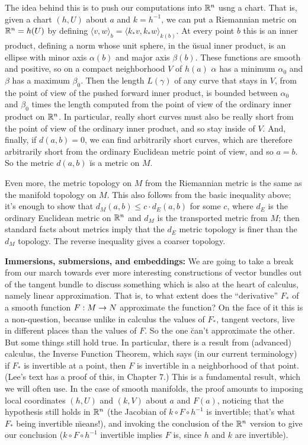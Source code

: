 The idea behind this is to push our computations into ${\Bbb R}^n$ usng a chart. That is,
given a chart $(h,U)$ about $a$ and $k=h^{-1}$, we can put a Riemannian metric on ${\Bbb R}^n=h(U)$ by
defining $\langle v,w\rangle_b=\langle k_*v,k_*w\rangle_{k(b)}$. At every point $b$ this is 
an inner product, defining a norm whose unit sphere, in the \u{usual} inner product,
is an ellipse with minor axis $\alpha(b)$ and major axis $\beta(b)$. These functions are
smooth and positive, so on a compact neighborhood $V$ of $h(a)$ $\alpha$ has a minimum
$\alpha_0$ and $\beta$ has a maximum $\beta_0$. Then the length $L(\gamma)$ of any curve that 
stays in $V$, from the point of view of the pushed forward inner product, is bounded 
between $\alpha_0$ and $\beta_0$ times the length computed from the point of view of the 
ordinary inner product on ${\Bbb R}^n$. In particular, really short curves must also be really short
from the point of view of the ordinary inner product, and so stay inside of $V$. And, finally,
if $d(a,b)=0$, we can find arbitrarily short curves, which are therefore arbitrarily short from 
the ordinary Euclidean metric point of view, and so $a=b$. So the metric $d(a,b)$ \u{is}
a metric on $M$.

Even more, the metric topology on $M$ from the Riemannian metric is the same as the manifold
topology on $M$. This also follows from the basic inequality above; it's enough to show that
$d_M(a,b)\leq c\cdot d_E(a,b)$ for some $c$, where $d_E$ is the ordinary Euclidean metric
on ${\Bbb R}^n$ and $d_M$ is the transported metric from $M$; then standard facts about
metrics imply that the $d_E$ metric topology is finer than the $d_M$ topology. The reverse
inequality gives a coarser topology.

\msk

{\bf Immersions, submersions, and embeddings:} We are going to take a break from our
march towards ever more interesting constructions of vector bundles out of the tangent
bundle to discuss something which is also at the heart of calculus, namely linear
approximation. That is, to what extent does the 
``derivative'' $F_*$ of a smooth function $F:M\rightarrow N$ approximate the function?
On the face of it this is a non-question, because unlike in calculus
the values of $F_*$, tangent vectors, live in different places than the values of $F$.
So the one \u{can't} approximate the other. But some things still hold true. In 
particular, there is a result from (advanced) calculus, the Inverse Function Theorem,
which says (in our current terminology) if $F_*$ is invertible at a point, then
$F$ is invertible in a neighborhood of that point. (Lee's text has a proof of this,
in Chapter 7.) This is a fundamental result,
which we will often use. In the case of smooth manifolds, the proof amounts to 
imposing local coordinates $(h,U)$ and $(k,V)$ about $a$ and $F(a)$, noticing 
that the hypothesis still holds in ${\Bbb R}^n$ (the Jacobian of
$k\circ F\circ h^{-1}$ is invertible; that's what $F_*$ being invertible \u{means}!),
and invoking the conclusion of the ${\Bbb R}^n$ version to give our conclusion
($k\circ F\circ h^{-1}$ invertible implies $F$ is, since $h$ and $k$ are
invertible). 

